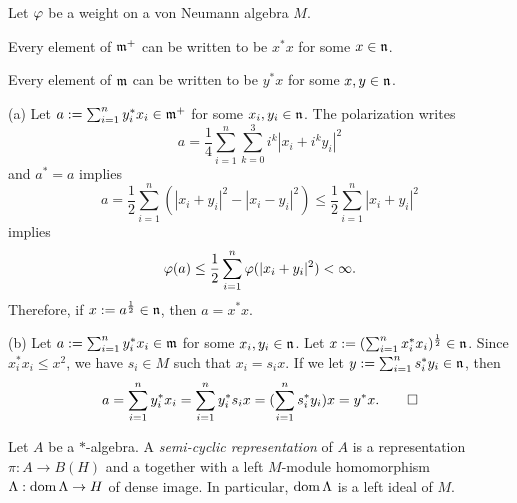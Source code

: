 \documentclass{../../../small}
\begin{document}
\begin{prop}
Let $\varphi$ be a weight on a von Neumann algebra $M$.
\begin{parts}
\item Every element of $\mathfrak{m}^+$ can be written to be $x^*x$ for some $x\in\mathfrak{n}$.
\item Every element of $\mathfrak{m}$ can be written to be $y^*x$ for some $x,y\in\mathfrak{n}$.
\end{parts}
\end{prop}
\begin{pf}
(a)
Let $a:=\sum_{i=1}^ny_i^*x_i\in\mathfrak{m}^+$ for some $x_i,y_i\in\mathfrak{n}$.
The polarization writes
\[a=\frac14\sum_{i=1}^n\sum_{k=0}^3i^k|x_i+i^ky_i|^2\]
and $a^*=a$ implies
\[a=\frac12\sum_{i=1}^n(|x_i+y_i|^2-|x_i-y_i|^2)\le\frac12\sum_{i=1}^n|x_i+y_i|^2\]
implies
\[\varphi(a)\le\frac12\sum_{i=1}^n\varphi(|x_i+y_i|^2)<\infty.\]
Therefore, if $x:=a^{\frac12}\in\mathfrak{n}$, then $a=x^*x$.

(b)
Let $a:=\sum_{i=1}^ny_i^*x_i\in\mathfrak{m}$ for some $x_i,y_i\in\mathfrak{n}$.
Let $x:=(\sum_{i=1}^nx_i^*x_i)^{\frac12}\in\mathfrak{n}$.
Since $x_i^*x_i\le x^2$, we have $s_i\in M$ such that $x_i=s_ix$.
If we let $y:=\sum_{i=1}^ns_i^*y_i\in\mathfrak{n}$, then
\[a=\sum_{i=1}^ny_i^*x_i=\sum_{i=1}^ny_i^*s_ix=(\sum_{i=1}^ns_i^*y_i)x=y^*x.\qedhere\]
\end{pf}


\begin{defn}
Let $A$ be a $*$-algebra.
A \emph{semi-cyclic representation} of $A$ is a representation $\pi:A\to B(H)$ and a together with a left $M$-module homomorphism $\Lambda:\operatorname{dom}\Lambda\to H$ of dense image.
In particular, $\operatorname{dom}\Lambda$ is a left ideal of $M$.
\end{defn}
\end{document}
